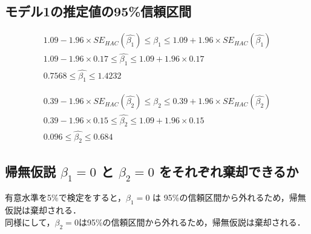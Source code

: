 \documentclass{article}
\begin{document}
\subsection{モデル1の推定値の95\%信頼区間}

\begin{centering}
  \begin{gather}
    1.09 - 1.96 \times SE_{HAC}(\hat{\beta_1}) \le \hat{\beta_1} \le 1.09 + 1.96 \times SE_{HAC}(\hat{\beta_1}) \\
    1.09 - 1.96 \times 0.17 \le \hat{\beta_1} \le 1.09 + 1.96 \times 0.17 \\
    0.7568 \le \hat{\beta_1} \le 1.4232
  \end{gather}
\end{centering}

\begin{centering}
  \begin{gather}
    0.39 - 1.96 \times SE_{HAC}(\hat{\beta_2}) \le \hat{\beta_2} \le 0.39 + 1.96 \times SE_{HAC}(\hat{\beta_2}) \\
    0.39 - 1.96 \times 0.15 \le \hat{\beta_2} \le 1.09 + 1.96 \times 0.15 \\
    0.096 \le \hat{\beta_2} \le 0.684
  \end{gather}
\end{centering}

\subsection{帰無仮説 $\beta_1 = 0$ と $\beta_2 = 0$ をそれぞれ棄却できるか }

有意水準を5\%で検定をすると，$\beta_1 = 0$ は 95\%の信頼区間から外れるため，帰無仮説は棄却される．\\
同様にして，$\beta_2 = 0$は95\%の信頼区間から外れるため，帰無仮説は棄却される．
\end{document}
